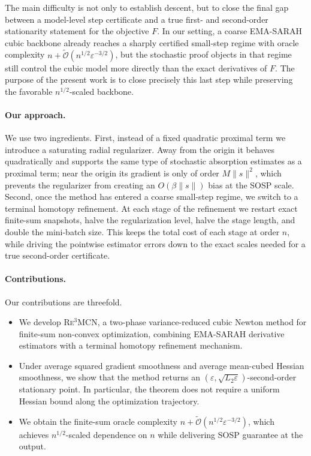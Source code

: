 \documentclass{article}
\theoremstyle{plain}
\theoremstyle{definition}
\theoremstyle{remark}
\begin{document}
The main difficulty is not only to establish descent, but to close the final gap between a {model-level} step certificate and a {true} first- and second-order stationarity statement for the objective \(F\). In our setting, a coarse EMA-SARAH cubic backbone already reaches a sharply certified small-step regime with oracle complexity $n+\widetilde{\mathcal O}\!\left(n^{1/2}\varepsilon^{-3/2}\right)$,
but the stochastic proof objects in that regime still control the cubic model more directly than the exact derivatives of \(F\). The purpose of the present work is to close precisely this last step while preserving the favorable \(n^{1/2}\)-scaled backbone.

\paragraph{Our approach.}
We use two ingredients. First, instead of a fixed quadratic proximal term we introduce a {saturating radial regularizer}. Away from the origin it behaves quadratically and supports the same type of stochastic absorption estimates as a proximal term; near the origin its gradient is only of order \(M\|s\|^2\), which prevents the regularizer from creating an \(O(\beta \|s\|)\) bias at the SOSP scale. Second, once the method has entered a coarse small-step regime, we switch to a {terminal homotopy refinement}. At each stage of the refinement we restart exact finite-sum snapshots, halve the regularization level, halve the stage length, and double the mini-batch size. This keeps the total cost of each stage at order \(n\), while driving the pointwise estimator errors down to the exact scales needed for a true second-order certificate.

\paragraph{Contributions.}
Our contributions are threefold.
\begin{itemize}[leftmargin=1.25em]
    \item We develop \textsc{Re$^3$MCN}, a two-phase variance-reduced cubic Newton method for finite-sum non-convex optimization, combining EMA-SARAH derivative estimators with a terminal homotopy refinement mechanism.

    \item Under average squared gradient smoothness and average mean-cubed Hessian smoothness, we show that the method returns an \((\varepsilon,\sqrt{L_2\varepsilon})\)-second-order stationary point. In particular, the theorem does not require a uniform Hessian bound along the optimization trajectory.

    \item We obtain the finite-sum oracle complexity $n+\widetilde{\mathcal O}\!\left(n^{1/2}\varepsilon^{-3/2}\right)$,
    which achieves \(n^{1/2}\)-scaled dependence on \(n\) while delivering SOSP guarantee at the output.
\end{itemize}
\end{document}
